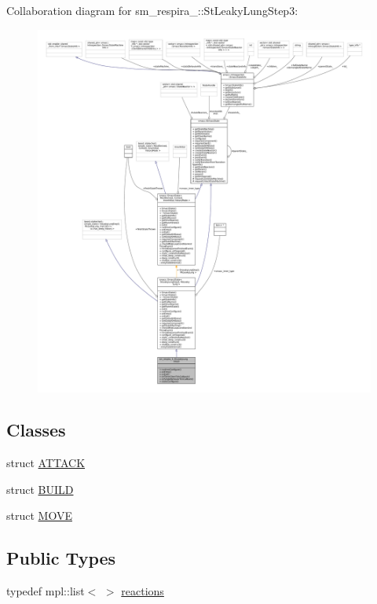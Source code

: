 Collaboration diagram for sm\+\_\+respira\+\_\+:\+:St\+Leaky\+Lung\+Step3\+:
\nopagebreak
\begin{figure}[H]
\begin{center}
\leavevmode
\includegraphics[width=350pt]{structsm__respira__1_1_1StLeakyLungStep3__coll__graph}
\end{center}
\end{figure}
\subsection*{Classes}
\begin{DoxyCompactItemize}
\item 
struct \hyperlink{structsm__respira__1_1_1StLeakyLungStep3_1_1ATTACK}{A\+T\+T\+A\+CK}
\item 
struct \hyperlink{structsm__respira__1_1_1StLeakyLungStep3_1_1BUILD}{B\+U\+I\+LD}
\item 
struct \hyperlink{structsm__respira__1_1_1StLeakyLungStep3_1_1MOVE}{M\+O\+VE}
\end{DoxyCompactItemize}
\subsection*{Public Types}
\begin{DoxyCompactItemize}
\item 
typedef mpl\+::list$<$  $>$ \hyperlink{structsm__respira__1_1_1StLeakyLungStep3_a5f16ee57548be4a1487c0dc6c9965737}{reactions}
\end{DoxyCompactItemize}
